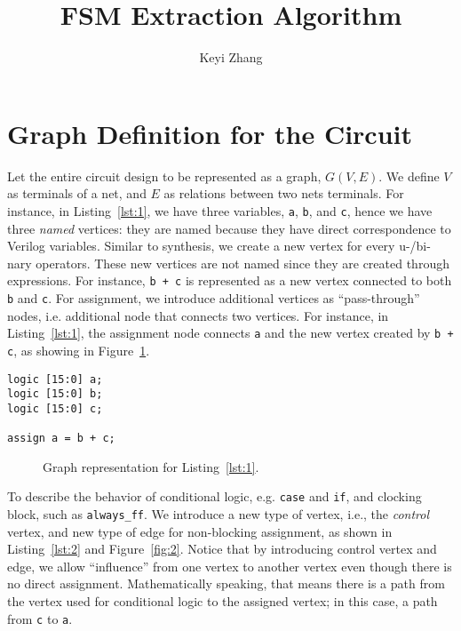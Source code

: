 \documentclass{article}
\title{FSM Extraction Algorithm}
\author{Keyi Zhang}
\begin{document}
\maketitle
\section{Graph Definition for the Circuit}\label{sec:1}
Let the entire circuit design to be represented as a graph, $G(V, E)$. We define $V$
as terminals of a net, and $E$ as relations between two nets terminals.
For instance, in Listing~\ref{lst:1}, we have three variables, \texttt{a}, \texttt{b},
and \texttt{c}, hence we have three \textit{named} vertices: they are named because
they have direct correspondence to Verilog variables. Similar to synthesis, we create
a new vertex for every u-/bi-nary operators. These new vertices are not named
since they are created through expressions. For instance, \texttt{b + c} is represented
as a new vertex connected to both \texttt{b} and \texttt{c}.
For assignment, we introduce additional vertices as
``pass-through'' nodes, i.e. additional node that connects two vertices. For instance,
in Listing~\ref{lst:1}, the assignment node connects \texttt{a} and the new vertex
created by \texttt{b + c}, as showing in Figure~\ref{fig:1}.
\begin{lstlisting}[style={verilog-style}, caption={Graph example from Verilog},
    label={lst:1}]
logic [15:0] a;
logic [15:0] b;
logic [15:0] c;

assign a = b + c;
\end{lstlisting}

\begin{figure}
    \centering
    \begin{tikzpicture}
    
    \end{tikzpicture}
    \caption{Graph representation for Listing~\ref{lst:1}.}
    \label{fig:1}
\end{figure}

To describe the behavior of conditional logic, e.g. \texttt{case} and \texttt{if}, and
clocking block, such as \texttt{always\_ff}. We introduce a new type of vertex, i.e.,
the \textit{control} vertex, and new type of edge for non-blocking assignment, as
shown in Listing~\ref{lst:2} and Figure~\ref{fig:2}. Notice that by introducing
control vertex and edge, we allow ``influence'' from one vertex to another vertex
even though there is no direct assignment. Mathematically speaking, that means
there is a path from the vertex used for conditional logic to the assigned vertex; in
this case, a path from \texttt{c} to \texttt{a}.
\end{document}
